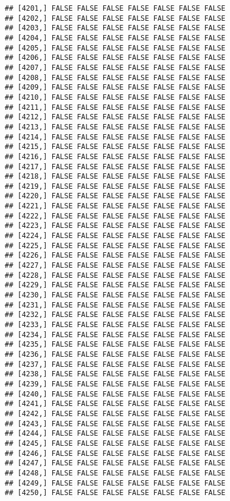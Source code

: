 \documentclass[
]{article}
\begin{document}
\begin{verbatim}
## [4201,] FALSE FALSE FALSE FALSE FALSE FALSE FALSE
## [4202,] FALSE FALSE FALSE FALSE FALSE FALSE FALSE
## [4203,] FALSE FALSE FALSE FALSE FALSE FALSE FALSE
## [4204,] FALSE FALSE FALSE FALSE FALSE FALSE FALSE
## [4205,] FALSE FALSE FALSE FALSE FALSE FALSE FALSE
## [4206,] FALSE FALSE FALSE FALSE FALSE FALSE FALSE
## [4207,] FALSE FALSE FALSE FALSE FALSE FALSE FALSE
## [4208,] FALSE FALSE FALSE FALSE FALSE FALSE FALSE
## [4209,] FALSE FALSE FALSE FALSE FALSE FALSE FALSE
## [4210,] FALSE FALSE FALSE FALSE FALSE FALSE FALSE
## [4211,] FALSE FALSE FALSE FALSE FALSE FALSE FALSE
## [4212,] FALSE FALSE FALSE FALSE FALSE FALSE FALSE
## [4213,] FALSE FALSE FALSE FALSE FALSE FALSE FALSE
## [4214,] FALSE FALSE FALSE FALSE FALSE FALSE FALSE
## [4215,] FALSE FALSE FALSE FALSE FALSE FALSE FALSE
## [4216,] FALSE FALSE FALSE FALSE FALSE FALSE FALSE
## [4217,] FALSE FALSE FALSE FALSE FALSE FALSE FALSE
## [4218,] FALSE FALSE FALSE FALSE FALSE FALSE FALSE
## [4219,] FALSE FALSE FALSE FALSE FALSE FALSE FALSE
## [4220,] FALSE FALSE FALSE FALSE FALSE FALSE FALSE
## [4221,] FALSE FALSE FALSE FALSE FALSE FALSE FALSE
## [4222,] FALSE FALSE FALSE FALSE FALSE FALSE FALSE
## [4223,] FALSE FALSE FALSE FALSE FALSE FALSE FALSE
## [4224,] FALSE FALSE FALSE FALSE FALSE FALSE FALSE
## [4225,] FALSE FALSE FALSE FALSE FALSE FALSE FALSE
## [4226,] FALSE FALSE FALSE FALSE FALSE FALSE FALSE
## [4227,] FALSE FALSE FALSE FALSE FALSE FALSE FALSE
## [4228,] FALSE FALSE FALSE FALSE FALSE FALSE FALSE
## [4229,] FALSE FALSE FALSE FALSE FALSE FALSE FALSE
## [4230,] FALSE FALSE FALSE FALSE FALSE FALSE FALSE
## [4231,] FALSE FALSE FALSE FALSE FALSE FALSE FALSE
## [4232,] FALSE FALSE FALSE FALSE FALSE FALSE FALSE
## [4233,] FALSE FALSE FALSE FALSE FALSE FALSE FALSE
## [4234,] FALSE FALSE FALSE FALSE FALSE FALSE FALSE
## [4235,] FALSE FALSE FALSE FALSE FALSE FALSE FALSE
## [4236,] FALSE FALSE FALSE FALSE FALSE FALSE FALSE
## [4237,] FALSE FALSE FALSE FALSE FALSE FALSE FALSE
## [4238,] FALSE FALSE FALSE FALSE FALSE FALSE FALSE
## [4239,] FALSE FALSE FALSE FALSE FALSE FALSE FALSE
## [4240,] FALSE FALSE FALSE FALSE FALSE FALSE FALSE
## [4241,] FALSE FALSE FALSE FALSE FALSE FALSE FALSE
## [4242,] FALSE FALSE FALSE FALSE FALSE FALSE FALSE
## [4243,] FALSE FALSE FALSE FALSE FALSE FALSE FALSE
## [4244,] FALSE FALSE FALSE FALSE FALSE FALSE FALSE
## [4245,] FALSE FALSE FALSE FALSE FALSE FALSE FALSE
## [4246,] FALSE FALSE FALSE FALSE FALSE FALSE FALSE
## [4247,] FALSE FALSE FALSE FALSE FALSE FALSE FALSE
## [4248,] FALSE FALSE FALSE FALSE FALSE FALSE FALSE
## [4249,] FALSE FALSE FALSE FALSE FALSE FALSE FALSE
## [4250,] FALSE FALSE FALSE FALSE FALSE FALSE FALSE

\end{verbatim}
\end{document}
